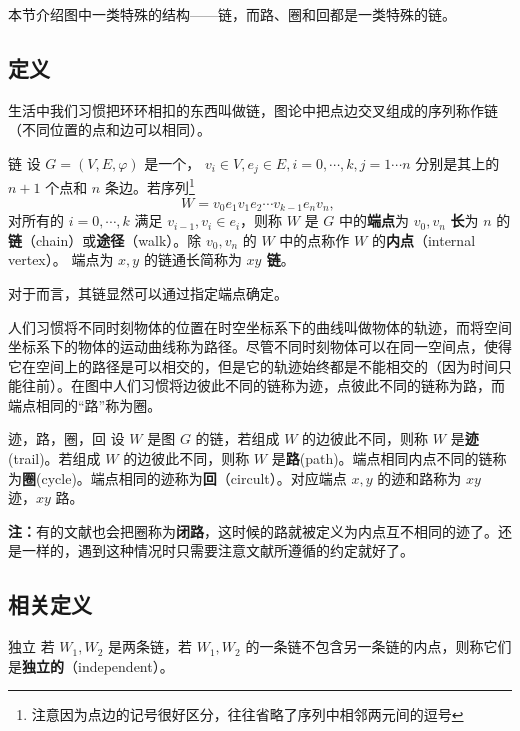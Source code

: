 
本节介绍图中一类特殊的结构——链，而路、圈和回都是一类特殊的链。

\subsection{定义}
生活中我们习惯把环环相扣的东西叫做链，图论中把点边交叉组成的序列称作链（不同位置的点和边可以相同）。

\begin{definition}{链}
设 $G=(V,E,\varphi)$ 是一个， $v_i\in V,e_j\in E,i=0,\cdots,k,j=1\cdots n$ 分别是其上的 $n+1$ 个点和 $n$ 条边。若序列\footnote{注意因为点边的记号很好区分，往往省略了序列中相邻两元间的逗号}
\begin{equation}
W=v_0 e_1v_1e_2\cdots v_{k-1} e_nv_n,~
\end{equation}
对所有的 $i=0,\cdots,k$ 满足 $v_{i-1},v_{i}\in e_{i}$，则称 $W$ 是 $G$ 中的\textbf{端点}为 $v_0,v_n$ \textbf{长}为 $n$ 的\textbf{链}（chain）或\textbf{途径}（walk）。除 $v_0,v_n$ 的 $W$ 中的点称作 $W$ 的\textbf{内点}（internal vertex）。 端点为 $x,y$ 的链通长简称为 \textbf{$xy$ 链}。
\end{definition}
对于而言，其链显然可以通过指定端点确定。

人们习惯将不同时刻物体的位置在时空坐标系下的曲线叫做物体的轨迹，而将空间坐标系下的物体的运动曲线称为路径。尽管不同时刻物体可以在同一空间点，使得它在空间上的路径是可以相交的，但是它的轨迹始终都是不能相交的（因为时间只能往前）。在图中人们习惯将边彼此不同的链称为迹，点彼此不同的链称为路，而端点相同的“路”称为圈。
\begin{definition}{迹，路，圈，回}
设 $W$ 是图 $G$ 的链，若组成 $W$ 的边彼此不同，则称 $W$ 是\textbf{迹}(trail)。若组成 $W$ 的边彼此不同，则称 $W$ 是\textbf{路}(path)。端点相同内点不同的链称为\textbf{圈}(cycle)。端点相同的迹称为\textbf{回}（circult）。对应端点 $x,y$ 的迹和路称为 $xy$ 迹，$xy$ 路。
\end{definition}
\textbf{注：}有的文献也会把圈称为\textbf{闭路}，这时候的路就被定义为内点互不相同的迹了。还是一样的，遇到这种情况时只需要注意文献所遵循的约定就好了。

\subsection{相关定义}

\begin{definition}{独立}
若 $W_1,W_2$ 是两条链，若  $W_1,W_2$ 的一条链不包含另一条链的内点，则称它们是\textbf{独立的}（independent）。 
\end{definition}


